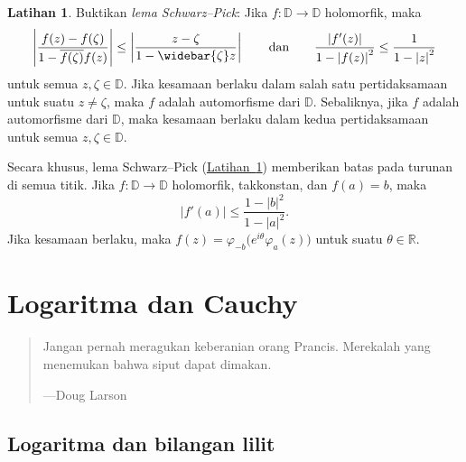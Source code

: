 \documentclass[12pt,openany]{book}
\newcommand{\sabs}[1]{\lvert {#1} \rvert}
\newcommand{\abs}[1]{\left\lvert {#1} \right\rvert}
\newcommand{\R}{{\mathbb{R}}}
\newcommand{\D}{{\mathbb{D}}}
\newcommand{\myindex}[1]{#1\index{#1}}
\theoremstyle{plain}
\theoremstyle{remark}
\theoremstyle{definition}
\newenvironment{exbox}{%
    \def\FrameCommand{\vrule width 1pt \relax\hspace{10pt}}%
    \MakeFramed{\advance\hsize-\width\FrameRestore}%
}{%
    \endMakeFramed
}
\newenvironment{myepigraph}{%
    \begin{quote}%
    \begingroup\itshape
}{%
    \endgroup%
    \end{quote}
}
\theoremstyle{exercise}
\newtheorem{exercise}{Latihan}[section]
\theoremstyle{example}
\newcommand{\exerciseref}[1]{\hyperref[#1]{Latihan~\ref*{#1}}}
\begin{document}
\begin{exbox}
\begin{exercise} \label{exercise:schwarzpick}
Buktikan \emph{\myindex{lema Schwarz--Pick}}:
Jika $f \colon \D \to \D$ holomorfik, maka
\begin{equation*}
\abs{
\frac{f(z)-f(\zeta)}{1-\overline{f(\zeta)}f(z)}
}
\leq
\abs{
\frac{z-\zeta}{1-\widebar{\zeta}z} 
}
\qquad
\text{dan}
\qquad
\frac{\abs{f'(z)}}{1-\abs{f(z)}^2} \leq
\frac{1}{1-\abs{z}^2}
\end{equation*}
untuk semua $z,\zeta \in \D$.
Jika kesamaan berlaku dalam salah satu
pertidaksamaan untuk suatu $z \neq \zeta$,
maka $f$ adalah automorfisme dari $\D$.
Sebaliknya, jika $f$ adalah automorfisme dari $\D$,
maka kesamaan berlaku dalam kedua pertidaksamaan untuk
semua $z,\zeta \in \D$.
\end{exercise}
\end{exbox}

\pagebreak[0]
Secara khusus, lema Schwarz--Pick (\exerciseref{exercise:schwarzpick}) memberikan batas pada turunan
di semua titik.  Jika
$f \colon \D \to \D$ holomorfik, takkonstan, dan $f(a) = b$,
maka
\begin{equation*}
\sabs{f'(a)} \leq
\frac{1-\sabs{b}^2}{1-\sabs{a}^2} .
\end{equation*}
Jika kesamaan berlaku, maka $f(z) = \varphi_{-b}\bigl( e^{i\theta} \varphi_a(z)
\bigr)$ untuk suatu $\theta \in \R$.



\chapter{Logaritma dan Cauchy} \label{ch:log}

\begin{myepigraph}
Jangan pernah meragukan keberanian orang Prancis. Merekalah yang menemukan bahwa siput dapat dimakan.

---Doug Larson
\end{myepigraph}


\section{Logaritma dan bilangan lilit}
\label{sec:log}
\end{document}
